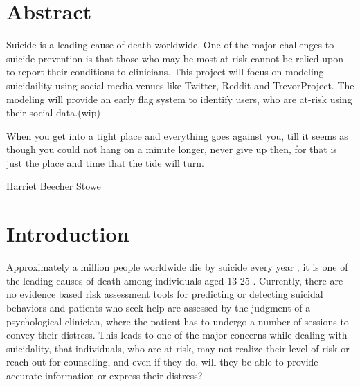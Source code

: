 \newcommand{\etc} {\emph{etc.\/}}
\newcommand{\etal}{\emph{et~al.\/}}
\newcommand{\eg}  {\emph{e.g.\/}}
\newcommand{\ie}  {\emph{i.e.\/}}


\section*{Abstract}
Suicide is a leading cause of death worldwide. One of the major challenges to suicide prevention is that those who may be most at risk cannot be relied upon to report their conditions to clinicians. This project will focus on modeling suicidaility using social media venues like Twitter, Reddit and TrevorProject. The modeling will provide an early flag system to identify users, who are at-risk using their social data.(wip) %
\vfill{}

\setcounter{page}{0} 
\newpage{}

\tableofcontents
\listoffigures
\listoftables

\pagebreak

\epigraph{When you get into a tight place and everything goes against you, till it seems as though you could not hang on a minute longer, never give up then, for that is just the place and time that the tide will turn.}{Harriet Beecher Stowe}

\section{Introduction}




Approximately a million people worldwide die by suicide every year \citep{who}, it is one of the leading causes of death among individuals aged 13-25 \citep{deaths}. Currently, there are no evidence based risk assessment tools for predicting or detecting suicidal behaviors and patients who seek help are assessed by the judgment of a psychological clinician, where the patient has to undergo a number of sessions to convey their distress. This leads to one of the major concerns while dealing with suicidality, that individuals, who are at risk, may not realize their level of risk or reach out for counseling, and even if they do,  will they be able to provide accurate information or express their distress?

